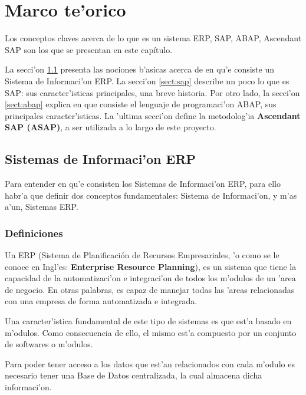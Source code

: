 \chapter{Marco te'orico} \label{chap:ssimilar}



Los conceptos claves acerca de lo que es un sistema ERP, SAP, ABAP, Ascendant SAP son los que se presentan en este capítulo.

La secci'on \ref{sect:erp} presenta las nociones b'asicas acerca de en qu'e consiste un Sistema de Informaci'on ERP. La secci'on 
\ref{sect:sap} describe un poco lo que es SAP: sus caracter'isticas principales, una  breve historia. Por otro lado, la secci'on \ref{sect:abap} explica en que consiste el lenguaje de programaci'on ABAP, sus principales caracter'isticas. La 'ultima secci'on define la metodolog'ia \textbf{Ascendant SAP (ASAP)}, a ser utilizada a lo largo de este proyecto.

\section{Sistemas de Informaci'on ERP} \label{sect:erp}

Para entender en qu'e consisten los Sistemas de Informaci'on ERP, para ello habr'a que definir dos conceptos fundamentales: Sistema de Informaci'on, y m'as a'un, Sistemas ERP. 

\subsection{Definiciones} \label{subsect:defprop}

\begin{definicion} \label{def:sisinfo}

\end{definicion}

\begin{definicion} \label{def:siserp}
Un ERP (Sistema de Planificación de Recursos Empresariales, 'o como se le conoce en Ingl'es: \textbf{Enterprise Resource Planning}), es un sistema que tiene la capacidad de la automatizaci'on e integraci'on de todos los m'odulos de un 'area de negocio. En otras palabras, es capaz de manejar todas las 'areas relacionadas con una empresa de forma automatizada e integrada. 

Una caracter'istica fundamental de este tipo de sistemas es que est'a basado en m'odulos. Como consecuencia de ello, el mismo est'a compuesto por un conjunto de softwares o m'odulos. 

Para poder tener acceso a los datos que est'an relacionados con cada m'odulo es necesario tener una Base de Datos centralizada, la cual almacena dicha informaci'on. 
\end{definicion}

